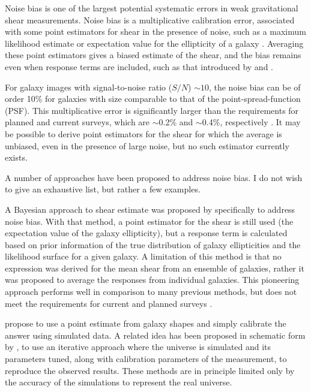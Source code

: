 \documentclass[usegraphicx,usenatbib]{mn2e}
\newcommand{\sn}{$S/N$}
\begin{document}
Noise bias is one of the largest potential systematic errors in weak
gravitational shear measurements.  Noise bias is a multiplicative calibration
error, associated with some point estimators for shear in the presence of
noise, such as a maximum likelihood estimate or expectation value for the
ellipticity of a galaxy \citep{HirataAlign04,Refreg12,Melchior12,Miller13}.
Averaging these point estimators gives a biased estimate of the shear, and the
bias remains even when response terms are included, such as that introduced by
\cite{ksb95} and \cite{Bern02}.

For galaxy images with signal-to-noise ratio (\sn) $\sim 10$, the noise bias
can be of order 10\% for galaxies with size comparable to that of the
point-spread-function (PSF).  This multiplicative error is significantly larger
than the requirements for planned and current surveys, which are $\sim$0.2\%
and $\sim$0.4\%, respectively \citep{HutererSystematics06}.  It may be possible
to derive point estimators for the shear for which the average is unbiased,
even in the presence of large noise, but no such estimator currently exists.

A number of approaches have been proposed to address noise bias. I do not wish
to give an exhaustive list, but rather a few examples.

A Bayesian approach to shear estimate was proposed by \cite{Miller07}
specifically to address noise bias.  With that method, a point estimator for
the shear is still used (the expectation value of the galaxy ellipticity), but
a response term is calculated based on prior information of the true
distribution of galaxy ellipticities and the likelihood surface for a given
galaxy.  A limitation of this method is that no expression was derived for the
mean shear from an ensemble of galaxies, rather it was proposed to average the
responses from individual galaxies.  This pioneering approach performs well in
comparison to many previous methods, but does not meet the requirements for
current and planned surveys \citep{ba14}.

\cite{Zuntz13} propose to use a point estimate from galaxy shapes and simply
calibrate the answer using simulated data.  A related idea has been proposed in
schematic form by \cite{Refregier13}, to use an iterative approach where the
universe is simulated and its parameters tuned, along with calibration
parameters of the measurement, to reproduce the observed results.  These
methods are in principle limited only by the accuracy of the simulations to
represent the real universe.
\end{document}
